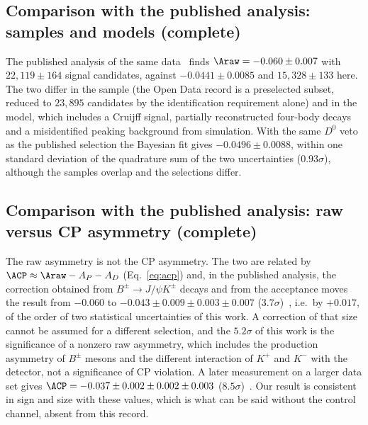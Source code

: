 \subsection{Comparison with the published analysis: samples and models (complete)}
The published analysis of the same data~\cite{lhcb_cpv_2013} finds $\Araw=-0.060\pm0.007$ with $22{,}119\pm164$ signal candidates, against $-0.0441\pm0.0085$ and $15{,}328\pm133$ here. The two differ in the sample (the Open Data record is a preselected subset, reduced to $23{,}895$ candidates by the identification requirement alone) and in the model, which includes a Cruijff signal, partially reconstructed four-body decays and a misidentified peaking background from simulation. With the same $D^0$ veto as the published selection the Bayesian fit gives $-0.0496\pm0.0088$, within one standard deviation of the quadrature sum of the two uncertainties ($0.93\sigma$), although the samples overlap and the selections differ.

\subsection{Comparison with the published analysis: raw versus CP asymmetry (complete)}
The raw asymmetry is not the CP asymmetry. The two are related by $\ACP\approx\Araw-A_P-A_D$ (Eq.~\eqref{eq:acp}) and, in the published analysis, the correction obtained from $B^\pm\to J/\psi K^\pm$ decays and from the acceptance moves the result from $-0.060$ to $-0.043\pm0.009\pm0.003\pm0.007$ ($3.7\sigma$)~\cite{lhcb_cpv_2013}, i.e.\ by $+0.017$, of the order of two statistical uncertainties of this work. A correction of that size cannot be assumed for a different selection, and the $5.2\sigma$ of this work is the significance of a nonzero raw asymmetry, which includes the production asymmetry of $B^\pm$ mesons and the different interaction of $K^+$ and $K^-$ with the detector, not a significance of CP violation. A later measurement on a larger data set gives $\ACP=-0.037\pm0.002\pm0.002\pm0.003$ ($8.5\sigma$)~\cite{lhcb_cpv_prd2023,lhcb_cpv_paper}. Our result is consistent in sign and size with these values, which is what can be said without the control channel, absent from this record.

